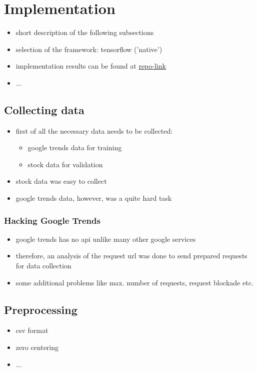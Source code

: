 \documentclass{IEEEtran}
\begin{document}
\section{Implementation}
\label{sec:implementation}

\begin{itemize}
	\item short description of the following subsections
	\item selection of the framework: tensorflow ('native')
	\item implementation results can be found at \url{repo-link}
	\item ...
\end{itemize}

\subsection{Collecting data}
\label{subsec:collectingdata}
\begin{itemize}
	\item{first of all the necessary data needs to be collected: \\
		\begin{itemize}
			\item google trends data for training
			\item stock data for validation
		\end{itemize}
}
	\item stock data was easy to collect
	\item google trends data, however, was a quite hard task
\end{itemize}

\subsubsection{Hacking Google Trends}
\label{subsubsec:hackinggoogletrends}
\begin{itemize}
	\item google trends has no api unlike many other google services
	\item therefore, an analysis of the request url was done to send prepared requests for data collection
	\item some additional problems like max. number of requests, request blockade etc.
\end{itemize}

\subsection{Preprocessing}
\label{subsec:preprocessing}
\begin{itemize}
	\item csv format
	\item zero centering
	\item ...
\end{itemize}
\end{document}
